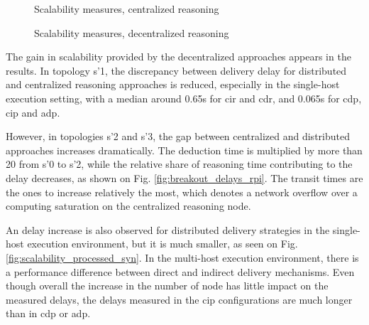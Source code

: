\documentclass{iosart2c}
\begin{document}
\begin{figure}
	\caption{Scalability measures, centralized reasoning}
	\label{fig:factory_scala_processed}
	\Centering
	\label{fig:factory_scala_raw_rpi}
	\scalebox{1}{
		
	}
\end{figure}

\begin{figure}
	\caption{Scalability measures, decentralized reasoning}
	\vfill
	\noindent
	
	\begin{minipage}{0.33\textwidth}
		\Centering
		\label{fig:scalability_processed_rpi}
		\scalebox{0.9}{
			
		}
	\end{minipage}
	\begin{minipage}{0.33\textwidth}
		\Centering
		\label{fig:scalability_processed_rpi2}
		\scalebox{0.9}{
			
		}
	\end{minipage}
	\begin{minipage}{0.329\textwidth}
		\Centering
		\label{fig:factory_scala_cip_rpi2}
		\scalebox{0.9}{
			
		}
	\end{minipage}
\end{figure}

The gain in scalability provided by the decentralized approaches appears in the results. 
In topology s'1, the discrepancy between delivery delay for distributed and centralized reasoning approaches is reduced, especially in the single-host execution setting, with a median around 0.65s for \gls{cir} and \gls{cdr}, and 0.065s for \gls{cdp}, \gls{cip} and \gls{adp}.

However, in topologies s'2 and s'3, the gap between centralized and distributed approaches increases dramatically. 
The deduction time is multiplied by more than 20 from s'0 to s'2, while the relative share of reasoning time contributing to the delay decreases, as shown on Fig. \ref{fig:breakout_delays_rpi}.
The transit times are the ones to increase relatively the most, which denotes a network overflow over a computing saturation on the centralized reasoning node.

An delay increase is also observed for distributed delivery strategies in the single-host execution environment, but it is much smaller, as seen on Fig. \ref{fig:scalability_processed_syn}.
In the multi-host execution environment, there is a performance difference between direct and indirect delivery mechanisms.
Even though overall the increase in the number of node has little impact on the measured delays, the delays measured in the \gls{cip} configurations are much longer than in \gls{cdp} or \gls{adp}. 
\end{document}
